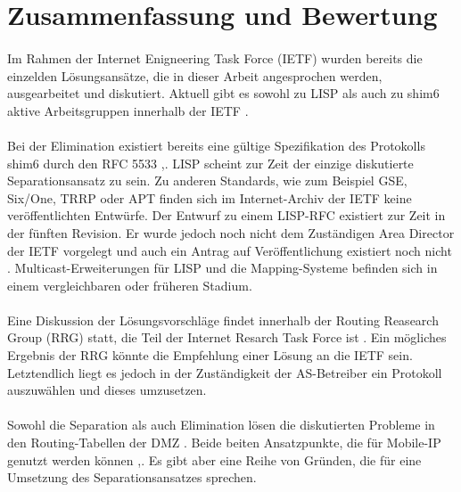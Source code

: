 \section{Zusammenfassung und Bewertung}
\paragraph{}
Im Rahmen der Internet Enigneering Task Force (IETF) wurden bereits die einzelden Lösungsansätze, die in dieser Arbeit angesprochen werden, ausgearbeitet und diskutiert. Aktuell gibt es sowohl zu LISP als auch zu shim6 aktive Arbeitsgruppen innerhalb der IETF \cite{ietf:groups}.

\paragraph{}
Bei der Elimination existiert bereits eine gültige Spezifikation des Protokolls shim6 durch den RFC 5533 \cite{nordmark:2009:RFC5533},\cite{ietf:documents}. LISP scheint zur Zeit der einzige diskutierte Separationsansatz zu sein. Zu anderen Standards, wie zum Beispiel GSE, Six/One, TRRP oder APT finden sich im Internet-Archiv der IETF keine veröffentlichten Entwürfe. Der Entwurf zu einem LISP-RFC \cite{farinacci:2009:LISP} existiert zur Zeit in der fünften Revision. Er wurde jedoch noch nicht dem Zuständigen Area Director der IETF vorgelegt und auch ein Antrag auf Veröffentlichung existiert noch nicht \cite{ietf:documents}.  Multicast-Erweiterungen für LISP und die Mapping-Systeme befinden sich in einem vergleichbaren oder früheren Stadium. 

\paragraph{}
Eine Diskussion der Lösungsvorschläge findet innerhalb der Routing Reasearch Group (RRG) statt, die Teil der Internet Resarch Task Force ist \cite{irtf:rrg}. Ein mögliches Ergebnis der RRG könnte die Empfehlung einer Lösung an die IETF sein. Letztendlich liegt es jedoch in der Zuständigkeit der AS-Betreiber ein Protokoll auszuwählen und dieses umzusetzen.

\paragraph{}
Sowohl die Separation als auch Elimination lösen die diskutierten Probleme in den Routing-Tabellen der DMZ \cite{jen:2008:start}. Beide beiten Ansatzpunkte, die für Mobile-IP genutzt werden können \cite{farinacci:2009:LISP},\cite{nordmark:2009:RFC5533}. Es gibt aber eine Reihe von Gründen, die für eine Umsetzung des Separationsansatzes sprechen. 

